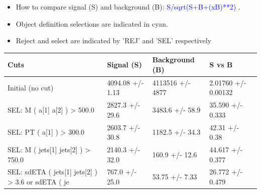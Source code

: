 \documentclass[a4paper, 10pt]{article}
\begin{document}
\begin{itemize}
  \item How to compare signal (S) and background (B): \textcolor{blue}{S/\-sqrt(S+B+(xB)**2)} .
   \item Object definition selections are indicated in cyan.  \item Reject and select are indicated by 'REJ' and 'SEL' respectively
\end{itemize}
\begin{table}[H]
  \begin{center}
    \begin{tabular}{|m{36.0mm}|m{36.0mm}|m{36.0mm}|m{33.0mm}|}
      \hline
      {\cellcolor{yellow}        Cuts}& {\cellcolor{yellow}         Signal (S)}& {\cellcolor{yellow}         Background (B)}& {\cellcolor{yellow}         S vs B}\\
      \hline
      {\cellcolor{white}         Initial (no cut)}& {\cellcolor{white}         4094.08 +/\-- 1.13}& {\cellcolor{white}         4113516 +/\-- 4877}& {\cellcolor{white}         2.01760 +/\-- 0.00132}\\
      \hline
      {\cellcolor{white} SEL: M ( a[1] a[2] ) > 500.0}& {\cellcolor{white}         2827.3 +/\-- 29.6}& {\cellcolor{white}         3483.6 +/\-- 58.9}& {\cellcolor{white}         35.590 +/\-- 0.333}\\
      \hline
      {\cellcolor{white} SEL: PT ( a[1] ) > 300.0}& {\cellcolor{white}         2603.7 +/\-- 30.8}& {\cellcolor{white}         1182.5 +/\-- 34.3}& {\cellcolor{white}         42.31 +/\-- 0.38}\\
      \hline
      {\cellcolor{white} SEL: M ( jets[1] jets[2] ) > 750.0}& {\cellcolor{white}         2140.3 +/\-- 32.0}& {\cellcolor{white}         160.9 +/\-- 12.6}& {\cellcolor{white}         44.617 +/\-- 0.377}\\
      \hline
      {\cellcolor{white} SEL: sdETA ( jets[1] jets[2] ) > 3.6 or sdETA ( je}& {\cellcolor{white}         767.0 +/\-- 25.0}& {\cellcolor{white}         53.75 +/\-- 7.33}& {\cellcolor{white}         26.772 +/\-- 0.479}\\
\hline
    \end{tabular}
  \end{center}
\end{table}
\end{document}
